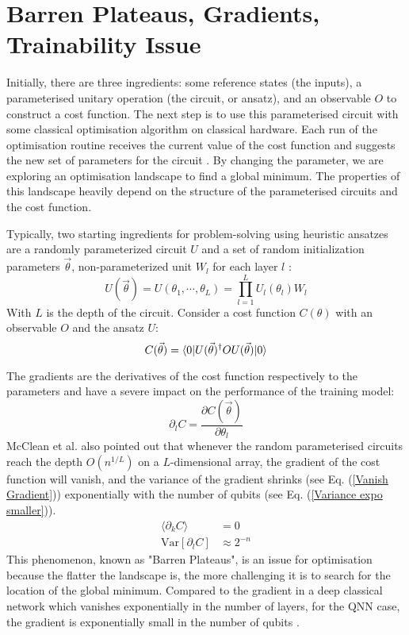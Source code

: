 \section{Barren Plateaus, Gradients, Trainability Issue}
Initially, there are three ingredients: some reference states (the inputs), a parameterised unitary operation (the circuit, or ansatz), and an observable $O$ to construct a cost function.
The next step is to use this parameterised circuit with some classical optimisation algorithm on classical hardware.
Each run of the optimisation routine receives the current value of the cost function and suggests the new set of parameters for the circuit \cite{cerezo2021variational}.
By changing the parameter, we are exploring an optimisation landscape to find a global minimum.
The properties of this landscape heavily depend on the structure of the parameterised circuits and the cost function.

Typically, two starting ingredients for problem-solving using heuristic ansatzes are a randomly parameterized circuit $U$ and a set of random initialization parameters $\vec{\theta}$, non-parameterized unit $W_l$ for each layer $l$ \cite{mccleanBarrenPlateausQuantum2018}:
\begin{equation}\label{Parameterized Circuit}
    U(\vec{\theta})
    = U(\theta_1, \cdots, \theta_L)
    = \prod_{l=1}^L U_l(\theta_l)W_l
\end{equation}
With $L$ is the depth of the circuit. Consider a cost function $C(\theta)$ with an observable $O$ and the ansatz $U$:
\begin{equation}
    C(\vec{\theta})
    = \bra{0} U(\vec{\theta})^\dagger OU(\vec{\theta}) \ket{0}
\end{equation}

The gradients are the derivatives of the cost function respectively to the parameters and have a severe impact on the performance of the training model:
\begin{equation}
    \partial_l C = \frac{\partial C(\vec{\theta})}{\partial\theta_l}
\end{equation}
McClean et al.\cite{mccleanBarrenPlateausQuantum2018} also pointed out that whenever the random parameterised circuits reach the depth $O(n^{1/L})$ on a $L$-dimensional array, the gradient of the cost function will vanish, and the variance of the gradient shrinks (see Eq. (\ref{Vanish Gradient})) exponentially with the number of qubits (see Eq. (\ref{Variance expo smaller})).
\begin{align}
    \langle \partial_k C\rangle &= 0  \label{Vanish Gradient}\\
    \mathrm{Var}[\partial_l C] &\approx 2^{-n}  \label{Variance expo smaller}
\end{align}
This phenomenon, known as "Barren Plateaus", is an issue for optimisation because the flatter the landscape is, the more challenging it is to search for the location of the global minimum.
Compared to the gradient in a deep classical network which vanishes exponentially in the number of layers, for the QNN case, the gradient is exponentially small in the number of qubits \cite{mccleanBarrenPlateausQuantum2018}.

